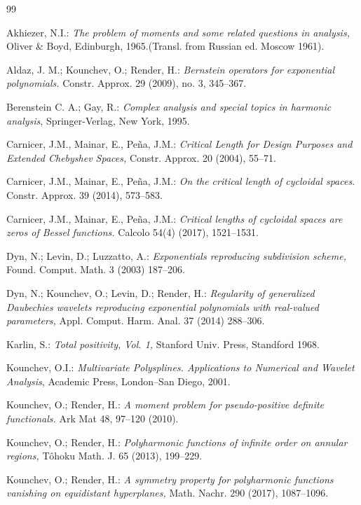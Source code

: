\documentclass[11pt]{article}%
\begin{document}
\begin{thebibliography}{99}                                                                                               %


Akhiezer, N.I.: \emph{The problem of moments and some related
questions in analysis,} Oliver \& Boyd, Edinburgh, 1965.(Transl. from Russian
ed. Moscow 1961).

Aldaz, J. M.; Kounchev, O.; Render, H.: \emph{Bernstein
operators for exponential polynomials.} Constr. Approx. 29 (2009), no. 3, 345--367.

Berenstein C. A.; Gay, R.: \emph{Complex analysis and special
topics in harmonic analysis}, Springer-Verlag, New York, 1995.

Carnicer, J.M., Mainar, E., Pe\~{n}a, J.M.: \emph{Critical
Length for Design Purposes and Extended Chebyshev Spaces,} Constr. Approx. 20
(2004), 55--71.

Carnicer, J.M., Mainar, E., Pe\~{n}a, J.M.: \emph{On the
critical length of cycloidal spaces}. Constr. Approx. 39 (2014), 573--583.

Carnicer, J.M., Mainar, E., Pe\~{n}a, J.M.: \emph{Critical
lengths of cycloidal spaces are zeros of Bessel functions.} Calcolo 54(4)
(2017), 1521--1531.

Dyn, N.; Levin, D.; Luzzatto, A.: \emph{Exponentials
reproducing subdivision scheme,} Found. Comput. Math. 3 (2003) 187--206.

Dyn, N.; Kounchev, O.; Levin, D.; Render, H.:
\emph{Regularity of generalized Daubechies wavelets reproducing exponential
polynomials with real-valued parameters, }Appl. Comput. Harm. Anal. 37 (2014) 288--306.

Karlin, S.: \emph{Total positivity, Vol. 1,} Stanford Univ.
Press, Standford 1968.

Kounchev, O.I.: \emph{Multivariate Polysplines. Applications
to Numerical and Wavelet Analysis}, Academic Press, London--San Diego, 2001.

Kounchev, O.; Render, H.: \emph{A moment problem for
pseudo-positive definite functionals.} Ark Mat 48, 97--120 (2010). 

Kounchev, O.; Render, H.: \emph{Polyharmonic functions of
infinite order on annular regions,} T\^{o}hoku Math. J. 65 (2013), 199--229.

Kounchev, O.; Render, H.: \emph{A symmetry property for
polyharmonic functions vanishing on equidistant hyperplanes,} Math. Nachr. 290
(2017), 1087--1096.


\end{thebibliography}
\end{document}
